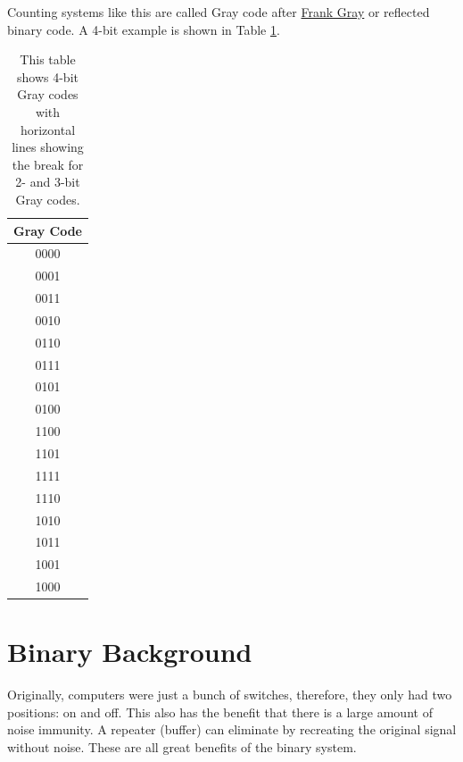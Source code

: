 Counting systems like this are called Gray code after \href{https://en.wikipedia.org/wiki/Gray_code}{Frank Gray} 
or reflected binary code. A 4-bit example is shown in Table \ref{table:graycode}.

\begin{table}[!ht]
	\centering
	\begin{tabular}{c}
		\hline
		{Gray Code}   \\ 
		\hline
		0000 \\
		0001 \\
		0011 \\
		0010 \\
		\hline
		0110 \\
		0111 \\
		0101 \\
		0100 \\
		\hline
		1100 \\
		1101 \\
		1111 \\
		1110 \\
		1010 \\
		1011 \\
		1001 \\
		1000 \\
		\hline
	\end{tabular}
	\caption{This table shows 4-bit Gray codes with horizontal lines showing the break for 2- and 3-bit Gray codes.}
	\label{table:graycode}
\end{table}

\section{Binary Background}
Originally, computers were just a bunch of switches, therefore, they only had two positions: on and off. 
This also has the benefit that there is a large amount of noise immunity. A repeater (buffer) can eliminate 
by recreating the original signal without noise. These are all great benefits of the binary system.
